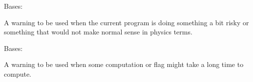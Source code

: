 \documentclass[letterpaper,10pt,english]{sphinxmanual}
\begin{document}

\begin{fulllineitems}
\label{\detokenize{Robustness.warning:Robustness.warning.PhysicsWarning}}
Bases: {\hyperref[\detokenize{Robustness.warning:Robustness.warning.PhysicalityWarning}]{}}

A warning to be used when the current program is doing something a bit
risky or something that would not make normal sense in physics terms.

\end{fulllineitems}


\begin{fulllineitems}
\label{\detokenize{Robustness.warning:Robustness.warning.TimeWarning}}
Bases: 

A warning to be used when some computation or flag might take a long time
to compute.

\end{fulllineitems}

\end{document}
